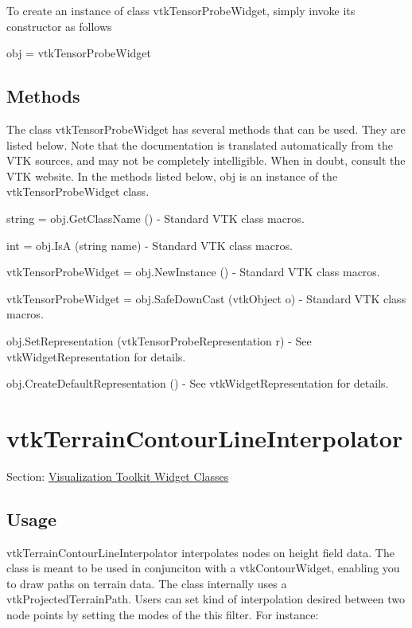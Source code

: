 To create an instance of class vtk\-Tensor\-Probe\-Widget, simply invoke its constructor as follows \begin{DoxyVerb}  obj = vtkTensorProbeWidget
\end{DoxyVerb}
 \hypertarget{vtkwidgets_vtkxyplotwidget_Methods}{}\subsection{Methods}\label{vtkwidgets_vtkxyplotwidget_Methods}
The class vtk\-Tensor\-Probe\-Widget has several methods that can be used. They are listed below. Note that the documentation is translated automatically from the V\-T\-K sources, and may not be completely intelligible. When in doubt, consult the V\-T\-K website. In the methods listed below, {\ttfamily obj} is an instance of the vtk\-Tensor\-Probe\-Widget class. 
\begin{DoxyItemize}
\item {\ttfamily string = obj.\-Get\-Class\-Name ()} -\/ Standard V\-T\-K class macros.  
\item {\ttfamily int = obj.\-Is\-A (string name)} -\/ Standard V\-T\-K class macros.  
\item {\ttfamily vtk\-Tensor\-Probe\-Widget = obj.\-New\-Instance ()} -\/ Standard V\-T\-K class macros.  
\item {\ttfamily vtk\-Tensor\-Probe\-Widget = obj.\-Safe\-Down\-Cast (vtk\-Object o)} -\/ Standard V\-T\-K class macros.  
\item {\ttfamily obj.\-Set\-Representation (vtk\-Tensor\-Probe\-Representation r)} -\/ See vtk\-Widget\-Representation for details.  
\item {\ttfamily obj.\-Create\-Default\-Representation ()} -\/ See vtk\-Widget\-Representation for details.  
\end{DoxyItemize}\hypertarget{vtkwidgets_vtkterraincontourlineinterpolator}{}\section{vtk\-Terrain\-Contour\-Line\-Interpolator}\label{vtkwidgets_vtkterraincontourlineinterpolator}
Section\-: \hyperlink{sec_vtkwidgets}{Visualization Toolkit Widget Classes} \hypertarget{vtkwidgets_vtkxyplotwidget_Usage}{}\subsection{Usage}\label{vtkwidgets_vtkxyplotwidget_Usage}
vtk\-Terrain\-Contour\-Line\-Interpolator interpolates nodes on height field data. The class is meant to be used in conjunciton with a vtk\-Contour\-Widget, enabling you to draw paths on terrain data. The class internally uses a vtk\-Projected\-Terrain\-Path. Users can set kind of interpolation desired between two node points by setting the modes of the this filter. For instance\-:

